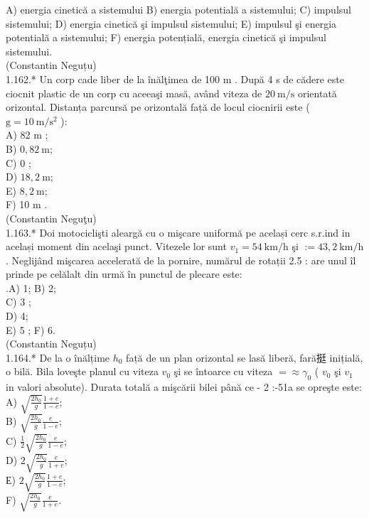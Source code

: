 \documentclass[10pt]{article}
\begin{document}
A) energia cinetică a sistemului B) energia potentială a sistemului; C) impulsul sistemului; D) energia cinetică şi impulsul sistemului; E) impulsul şi energia potentială a sistemului; F) energia potențială, energia cinetică şi impulsul sistemului.\\
(Constantin Neguțu)\\
1.162.* Un corp cade liber de la înălţimea de 100 m . După 4 s de cădere este ciocnit plastic de un corp cu aceeaşi masă, având viteza de $20 \mathrm{~m} / \mathrm{s}$ orientată orizontal. Distanța parcursă pe orizontală față de locul ciocnirii este ( $\mathrm{g}=10 \mathrm{~m} / \mathrm{s}^{2}$ ):\\
A) 82 m ;\\
B) $0,82 \mathrm{~m}$;\\
C) 0 ;\\
D) $18,2 \mathrm{~m}$;\\
E) $8,2 \mathrm{~m}$;\\
F) 10 m .\\
(Constantin Neguţu)\\
1.163.* Doi motociclişti aleargă cu o mişcare uniformă pe același cerc s.r.ind in același moment din acelaşi punct. Vitezele lor sunt $v_{1}=54 \mathrm{~km} / \mathrm{h}$ şi $:=43,2 \mathrm{~km} / \mathrm{h}$. Neglijând mişcarea accelerată de la pornire, numărul de rotații 2.5 : are unul îl prinde pe celălalt din urmă în punctul de plecare este:\\
.A) 1; B) 2;\\
C) 3 ;\\
D) 4;\\
E) 5 ; F) 6.\\
(Constantin Neguțu)\\
1.164.* De la o înălțime $h_{0}$ față de un plan orizontal se lasă liberă, fară挺 inițială, o bilă. Bila loveşte planul cu viteza $v_{0}$ şi se întoarce cu viteza $=\approx \gamma_{0}$ ( $v_{0}$ şi $v_{1}$ in valori absolute). Durata totală a mişcării bilei până ce - 2 :-51a se opreşte este:\\
A) $\sqrt{\frac{2 h_{0}}{g}} \frac{1+e}{1-e}$;\\
B) $\sqrt{\frac{2 h_{0}}{g}} \frac{e}{1-e}$;\\
C) $\frac{1}{2} \sqrt{\frac{2 h_{0}}{g}} \frac{e}{1-e}$;\\
D) $2 \sqrt{\frac{2 h_{0}}{g}} \frac{e}{1+e}$;\\
Е) $2 \sqrt{\frac{2 h_{0}}{g}} \frac{1+e}{1-e}$;\\
F) $\sqrt{\frac{2 h_{0}}{g}} \frac{e}{1+e}$.\\
\end{document}
